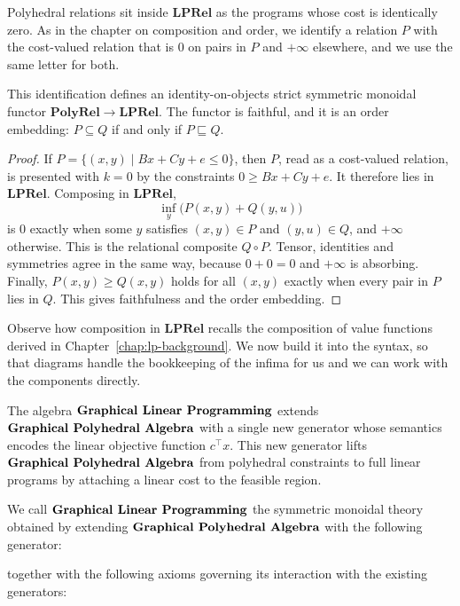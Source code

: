 Polyhedral relations sit inside $\mathbf{LPRel}$ as the programs whose
cost is identically zero. As in the chapter on composition and order, we
identify a relation $P$ with the cost-valued relation that is $0$ on
pairs in $P$ and $+\infty$ elsewhere, and we use the same letter for both.

\begin{proposition}\label{prop:indicator-embedding}
    This identification defines an identity-on-objects strict symmetric
    monoidal functor $\mathbf{PolyRel}\to\mathbf{LPRel}$. The functor is
    faithful, and it is an order embedding: $P\subseteq Q$ if and only if
    $P\sqsubseteq Q$.
\end{proposition}

\begin{proof}
    If $P=\{(x,y)\mid Bx+Cy+e\le 0\}$, then $P$, read as a cost-valued
    relation, is presented with $k=0$ by the constraints $0\ge Bx+Cy+e$.
    It therefore lies in $\mathbf{LPRel}$. Composing in $\mathbf{LPRel}$,
    \[
        \inf_y\bigl(P(x,y)+Q(y,u)\bigr)
    \]
    is $0$ exactly when some $y$ satisfies $(x,y)\in P$ and $(y,u)\in Q$,
    and $+\infty$ otherwise. This is the relational composite
    $Q\circ P$. Tensor, identities and symmetries agree in the same way,
    because $0+0=0$ and $+\infty$ is absorbing. Finally,
    $P(x,y)\ge Q(x,y)$ holds for all $(x,y)$ exactly when every pair in
    $P$ lies in $Q$. This gives faithfulness and the order embedding.
\end{proof}

Observe how composition in $\mathbf{LPRel}$ recalls the composition of
value functions derived in Chapter~\ref{chap:lp-background}. We now build
it into the syntax, so that diagrams handle the bookkeeping of the
infima for us and we can work with the components directly.

The algebra $\text{\bfseries Graphical Linear Programming}$ extends
$\text{\bfseries Graphical Polyhedral Algebra}$ with a single new generator
whose semantics encodes the
linear objective function $c^\top x$. This new generator lifts
$\text{\bfseries Graphical Polyhedral Algebra}$
from polyhedral constraints to full linear programs by attaching a
linear cost to the feasible region.

\begin{definition}\label{def:glp}
    We call $\text{\bfseries Graphical Linear Programming}$ the symmetric monoidal theory obtained by
    extending $\text{\bfseries Graphical Polyhedral Algebra}$ with the following generator:
    \begin{figure}[H]
        \centering
        
    \end{figure}
    together with the following axioms governing its interaction with
    the existing generators:
    \begin{figure}[H]
        \centering
        
    \end{figure}
\end{definition}

